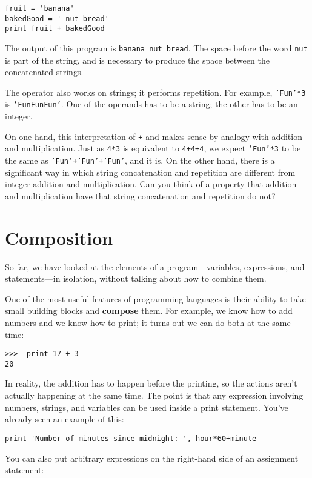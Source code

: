 
\beforeverb
\begin{verbatim}
fruit = 'banana'
bakedGood = ' nut bread'
print fruit + bakedGood
\end{verbatim}
\afterverb
%
The output of this program is {\tt banana nut bread}.  The space
before the word {\tt nut} is part of the string, and is necessary
to produce the space between the concatenated strings.

The {\tt *} operator also works on strings; it performs repetition.
For example, {\tt 'Fun'*3} is {\tt 'FunFunFun'}.  One of the operands
has to be a string; the other has to be an integer.

On one hand, this interpretation of {\tt +} and {\tt *} makes sense by
analogy with addition and multiplication.  Just as {\tt 4*3} is
equivalent to {\tt 4+4+4}, we expect {\tt 'Fun'*3} to be the same as
{\tt 'Fun'+'Fun'+'Fun'}, and it is.  On the other hand, there is a
significant way in which string concatenation and repetition are
different from integer addition and multiplication.
Can you think of a property that addition and multiplication have
that string concatenation and repetition do not?


\section{Composition}

So far, we have looked at the elements of a program---variables,
expressions, and statements---in isolation, without talking about how to
combine them.

One of the most useful features of programming languages is their
ability to take small building blocks and {\bf compose} them.  For
example, we know how to add numbers and we know how to print; it turns
out we can do both at the same time:

\beforeverb
\begin{verbatim}
>>>  print 17 + 3
20
\end{verbatim}
\afterverb
%
In reality, the
addition has to happen before the printing, so the actions aren't 
actually happening at the same time. The point is that any
expression involving numbers, strings, and variables can be used inside a
print statement.  You've already seen an example of this:

\beforeverb
\begin{verbatim}
print 'Number of minutes since midnight: ', hour*60+minute
\end{verbatim}
\afterverb
%
You can also put arbitrary expressions on the right-hand side of an
assignment statement:

